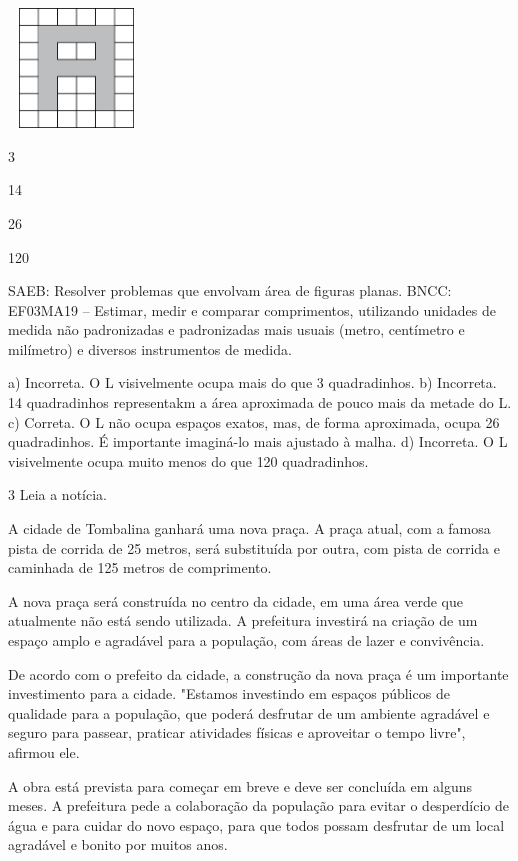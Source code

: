 \begin{escolha}
\includegraphics[width=1.42949in,height=1.25160in]{media/image62.png}

\begin{escolha}
\item
  3
\item
  14
\item
  26
\item
  120
\end{escolha}

SAEB: Resolver problemas que envolvam área de figuras planas. 
BNCC: EF03MA19 -- Estimar, medir e comparar comprimentos, utilizando unidades de medida
não padronizadas e padronizadas mais usuais (metro, centímetro e milímetro) e diversos
instrumentos de medida.

a) Incorreta. O L visivelmente ocupa mais do que 3 quadradinhos.
b) Incorreta. 14 quadradinhos representakm a área aproximada de pouco mais da metade do L.
c) Correta. O L não ocupa espaços exatos, mas, de forma aproximada, ocupa 26 quadradinhos. É importante imaginá-lo mais ajustado à malha.
d) Incorreta. O L visivelmente ocupa muito menos do que 120 quadradinhos.

\num{3} Leia a notícia.


A cidade de Tombalina ganhará uma nova praça. A praça atual, com a famosa pista de corrida de 25 metros, será substituída por outra, com pista de corrida e caminhada de 125 metros de comprimento.

A nova praça será construída no centro da cidade, em uma área verde que atualmente não está sendo utilizada. A prefeitura investirá na criação de um espaço amplo e agradável para a população, com áreas de lazer e convivência.

De acordo com o prefeito da cidade, a construção da nova praça é um importante investimento para a cidade. "Estamos investindo em espaços públicos de qualidade para a população, que poderá desfrutar de um ambiente agradável e seguro para passear, praticar atividades físicas e aproveitar o tempo livre", afirmou ele.

A obra está prevista para começar em breve e deve ser concluída em alguns meses. A prefeitura pede a colaboração da população para evitar o desperdício de água e para cuidar do novo espaço, para que todos possam desfrutar de um local agradável e bonito por muitos anos.


\end{escolha}
